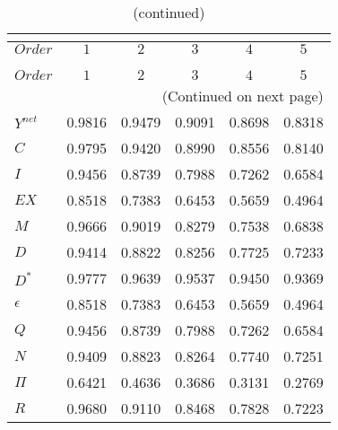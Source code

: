  
\begin{center}
\begin{longtable}{lccccc} 
\caption{COEFFICIENTS OF AUTOCORRELATION}\\
 \label{Table:th_autocorr_matrix}\\
\toprule 
$Order     $	 & 	 $         1$	 & 	 $         2$	 & 	 $         3$	 & 	 $         4$	 & 	 $         5$\\
\midrule \endfirsthead 
\caption{(continued)}\\
 \toprule \\ 
$Order     $	 & 	 $         1$	 & 	 $         2$	 & 	 $         3$	 & 	 $         4$	 & 	 $         5$\\
\midrule \endhead 
\midrule \multicolumn{6}{r}{(Continued on next page)} \\ \bottomrule \endfoot 
\bottomrule \endlastfoot 
$Y^{net}   $	 & 	    0.9816	 & 	    0.9479	 & 	    0.9091	 & 	    0.8698	 & 	    0.8318 \\ 
$C         $	 & 	    0.9795	 & 	    0.9420	 & 	    0.8990	 & 	    0.8556	 & 	    0.8140 \\ 
$I         $	 & 	    0.9456	 & 	    0.8739	 & 	    0.7988	 & 	    0.7262	 & 	    0.6584 \\ 
$EX        $	 & 	    0.8518	 & 	    0.7383	 & 	    0.6453	 & 	    0.5659	 & 	    0.4964 \\ 
$M         $	 & 	    0.9666	 & 	    0.9019	 & 	    0.8279	 & 	    0.7538	 & 	    0.6838 \\ 
$D         $	 & 	    0.9414	 & 	    0.8822	 & 	    0.8256	 & 	    0.7725	 & 	    0.7233 \\ 
$D^{*}     $	 & 	    0.9777	 & 	    0.9639	 & 	    0.9537	 & 	    0.9450	 & 	    0.9369 \\ 
$\epsilon  $	 & 	    0.8518	 & 	    0.7383	 & 	    0.6453	 & 	    0.5659	 & 	    0.4964 \\ 
$Q         $	 & 	    0.9456	 & 	    0.8739	 & 	    0.7988	 & 	    0.7262	 & 	    0.6584 \\ 
$N         $	 & 	    0.9409	 & 	    0.8823	 & 	    0.8264	 & 	    0.7740	 & 	    0.7251 \\ 
$\Pi       $	 & 	    0.6421	 & 	    0.4636	 & 	    0.3686	 & 	    0.3131	 & 	    0.2769 \\ 
$R         $	 & 	    0.9680	 & 	    0.9110	 & 	    0.8468	 & 	    0.7828	 & 	    0.7223 \\ 
\end{longtable}
 \end{center}
